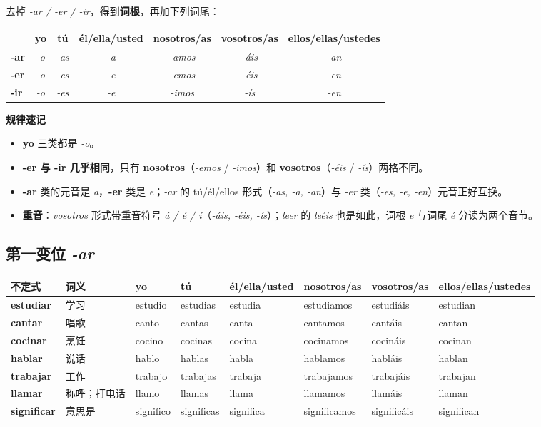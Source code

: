 \documentclass[a4paper,11pt]{ctexart}
\makeatletter
\newcommand{\es}[1]{\textit{#1}}
\newcommand{\conj}[8]{\textbf{#1} & {\small #2} & #3 & #4 & #5 & #6 & #7 & #8 \\}
\newenvironment{conjtable}{%
  \par\small\setlength{\tabcolsep}{3.5pt}
  \begin{tabular}{@{}>{\raggedright\arraybackslash}p{1.95cm}>{\raggedright\arraybackslash}p{1.6cm}%
    >{\raggedright\arraybackslash}p{1.75cm}>{\raggedright\arraybackslash}p{1.75cm}>{\raggedright\arraybackslash}p{1.95cm}%
    >{\raggedright\arraybackslash}p{2.15cm}>{\raggedright\arraybackslash}p{1.95cm}>{\raggedright\arraybackslash}p{2.1cm}@{}}
  \toprule
  \textbf{不定式} & \textbf{词义} & \textbf{yo} & \textbf{tú} & \textbf{él/ella/\newline usted} & \textbf{nosotros/as} & \textbf{vosotros/as} & \textbf{ellos/ellas/\newline ustedes} \\
  \midrule
}{%
  \bottomrule\end{tabular}\par\normalsize
}
\makeatother
\begin{document}
去掉 \es{-ar / -er / -ir}，得到\textbf{词根}，再加下列词尾：

\begin{center}
\begin{tabular}{lcccccc}
\toprule
 & yo & tú & él/ella/usted & nosotros/as & vosotros/as & ellos/ellas/ustedes \\
\midrule
\textbf{-ar} & \es{-o} & \es{-as} & \es{-a} & \es{-amos} & \es{-áis} & \es{-an} \\
\textbf{-er} & \es{-o} & \es{-es} & \es{-e} & \es{-emos} & \es{-éis} & \es{-en} \\
\textbf{-ir} & \es{-o} & \es{-es} & \es{-e} & \es{-imos} & \es{-ís} & \es{-en} \\
\bottomrule
\end{tabular}
\end{center}

\begin{rulebox}
\textbf{规律速记}
\begin{itemize}[leftmargin=1.3em,itemsep=1pt,topsep=2pt]
  \item \textbf{yo} 三类都是 \es{-o}。
  \item \textbf{-er 与 -ir 几乎相同}，只有 \textbf{nosotros}（\es{-emos} / \es{-imos}）和 \textbf{vosotros}（\es{-éis} / \es{-ís}）两格不同。
  \item \textbf{-ar} 类的元音是 \es{a}，\textbf{-er} 类是 \es{e}；\es{-ar} 的 tú/él/ellos 形式（\es{-as, -a, -an}）与 \es{-er} 类（\es{-es, -e, -en}）元音正好互换。
  \item \textbf{重音}：\es{vosotros} 形式带重音符号 \es{á / é / í}（\es{-áis, -éis, -ís}）；\es{leer} 的 \es{leéis} 也是如此，词根 \es{e} 与词尾 \es{é} 分读为两个音节。
\end{itemize}
\end{rulebox}

\subsection{第一变位 \es{-ar}}

\begin{conjtable}
\conj{estudiar}{学习}{estudio}{estudias}{estudia}{estudiamos}{estudiáis}{estudian}
\conj{cantar}{唱歌}{canto}{cantas}{canta}{cantamos}{cantáis}{cantan}
\conj{cocinar}{烹饪}{cocino}{cocinas}{cocina}{cocinamos}{cocináis}{cocinan}
\conj{hablar}{说话}{hablo}{hablas}{habla}{hablamos}{habláis}{hablan}
\conj{trabajar}{工作}{trabajo}{trabajas}{trabaja}{trabajamos}{trabajáis}{trabajan}
\conj{llamar}{称呼；打电话}{llamo}{llamas}{llama}{llamamos}{llamáis}{llaman}
\conj{significar}{意思是}{significo}{significas}{significa}{significamos}{significáis}{significan}
\end{conjtable}
\end{document}
